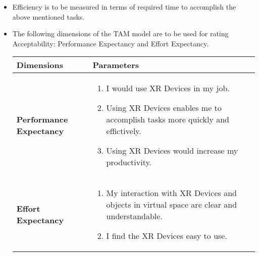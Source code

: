 \documentclass{article}
\begin{document}
\begin{itemize}
	\item Efficiency is to be measured in terms of required time to accomplish the above mentioned tasks.
	\item The following dimensions of the TAM model are to be used for rating Acceptability: Performance Expectancy and Effort Expectancy.
	      \begin{table}[htb]
		      \centering
		      \setlength{\leftmargini}{0.5cm}
		      \begin{tabular}{| m{2.5cm} | m{10.5cm}  |}
			      \hline
			      \textbf{Dimensions}                    & \textbf{Parameters}                                   \\
			      \hline \hfill \break
			      \textbf{Performance \break Expectancy} &
			      \begin{enumerate}
				      \item I would use XR Devices in my job.
				      \item Using XR Devices enables me to accomplish tasks more quickly and effictively.
				      \item Using XR Devices would increase my productivity.
			      \end{enumerate}             \\
			      \hline \hfill \break
			      \textbf{Effort \break Expectancy}      &
			      \begin{enumerate}
				      \item My interaction with XR Devices and objects in virtual space are clear and understandable.
				      \item I find the XR Devices easy to use.
			      \end{enumerate} \\
			      \hline
		      \end{tabular}
	      \end{table}

	      \newpage


\end{itemize}
\end{document}
